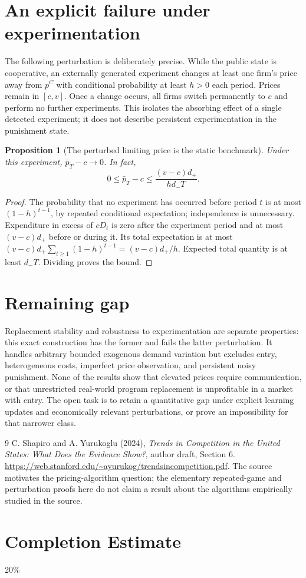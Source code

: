 \documentclass[11pt]{article}
\newtheorem{proposition}[theorem]{Proposition}
\theoremstyle{definition}
\theoremstyle{remark}
\begin{document}
\section{An explicit failure under experimentation}
The following perturbation is deliberately precise. While the public state is cooperative, an externally generated experiment changes at least one firm's price away from $p^C$ with conditional probability at least $h>0$ each period. Prices remain in $[c,v]$. Once a change occurs, all firms switch permanently to $c$ and perform no further experiments. This isolates the absorbing effect of a single detected experiment; it does not describe persistent experimentation in the punishment state.

\begin{proposition}[The perturbed limiting price is the static benchmark]
Under this experiment, $\bar p_T-c\longrightarrow0$. In fact,
\[
 0\le \bar p_T-c\le\frac{(v-c)d_+}{h d_-T}.
\]
\end{proposition}
\begin{proof}
The probability that no experiment has occurred before period $t$ is at most $(1-h)^{t-1}$, by repeated conditional expectation; independence is unnecessary. Expenditure in excess of $cD_t$ is zero after the experiment period and at most $(v-c)d_+$ before or during it. Its total expectation is at most $(v-c)d_+\sum_{t\ge1}(1-h)^{t-1}=(v-c)d_+/h$. Expected total quantity is at least $d_-T$. Dividing proves the bound.
\end{proof}

\section{Remaining gap}
Replacement stability and robustness to experimentation are separate properties: this exact construction has the former and fails the latter perturbation. It handles arbitrary bounded exogenous demand variation but excludes entry, heterogeneous costs, imperfect price observation, and persistent noisy punishment. None of the results show that elevated prices require communication, or that unrestricted real-world program replacement is unprofitable in a market with entry. The open task is to retain a quantitative gap under explicit learning updates and economically relevant perturbations, or prove an impossibility for that narrower class.

\begin{thebibliography}{9}
 C. Shapiro and A. Yurukoglu (2024), \emph{Trends in Competition in the United States: What Does the Evidence Show?}, author draft, Section 6. \url{https://web.stanford.edu/~ayurukog/trendsincompetition.pdf}. The source motivates the pricing-algorithm question; the elementary repeated-game and perturbation proofs here do not claim a result about the algorithms empirically studied in the source.
\end{thebibliography}
\section{Completion Estimate}
20\%
\end{document}
